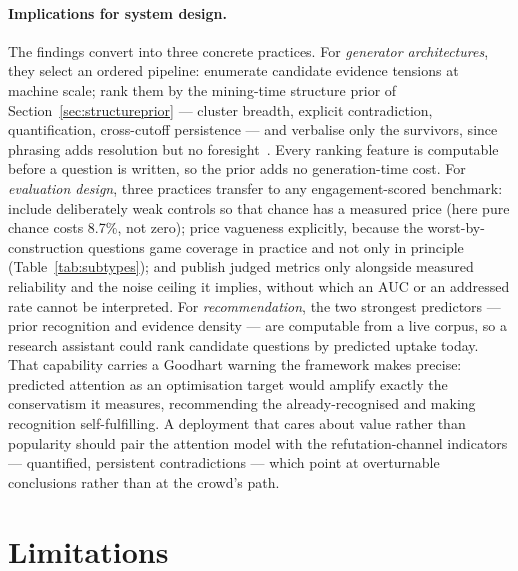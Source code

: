 \documentclass[11pt]{article}
\begin{document}
\paragraph{Implications for system design.} The findings convert into
three concrete practices. For \emph{generator architectures}, they
select an ordered pipeline: enumerate candidate evidence tensions at
machine scale; rank them by the mining-time structure prior of
Section~\ref{sec:structureprior} --- cluster breadth, explicit
contradiction, quantification, cross-cutoff persistence --- and
verbalise only the survivors, since phrasing adds resolution but no
foresight~\cite{paper2}. Every ranking feature is computable before a
question is written, so the prior adds no generation-time cost. For
\emph{evaluation design}, three practices transfer to any
engagement-scored benchmark: include deliberately weak controls so that
chance has a measured price (here pure chance costs 8.7\%, not zero);
price vagueness explicitly, because the worst-by-construction questions
game coverage in practice and not only in principle
(Table~\ref{tab:subtypes}); and publish judged metrics only alongside
measured reliability and the noise ceiling it implies, without which an
AUC or an addressed rate cannot be interpreted. For
\emph{recommendation}, the two strongest predictors --- prior
recognition and evidence density --- are computable from a live corpus,
so a research assistant could rank candidate questions by predicted
uptake today. That capability carries a Goodhart warning the framework
makes precise: predicted attention as an optimisation target would
amplify exactly the conservatism it measures, recommending the
already-recognised and making recognition self-fulfilling. A deployment
that cares about value rather than popularity should pair the attention
model with the refutation-channel indicators --- quantified, persistent
contradictions --- which point at overturnable conclusions rather than
at the crowd's path.

\section{Limitations}
\label{sec:limitations}
\end{document}

